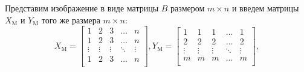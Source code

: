 \documentclass[12pt,a4paper]{article}
\begin{document}
Представим изображение в виде матрицы $B$ размером $m \times n$ и введем матрицы $X_{\text{M}}$ и $Y_{\text{M}}$ того же размера $m \times n$:
\begin{equation}\label{eq:eq16}
X_{\text{M}}=
\begin{bmatrix}
1 & 2 & 3 & \dots  & n \\
1 & 2 & 3 & \dots  & n \\
\vdots & \vdots & \vdots & \ddots & \vdots \\
1 & 2 & 3 & \dots  & n \\
\end{bmatrix}, 
Y_{\text{M}}=
\begin{bmatrix}
1 & 1 & 1 & \dots  & 1 \\
2 & 2 & 2 & \dots  & 2 \\
\vdots & \vdots & \vdots & \ddots & \vdots \\
m & m & m & \dots  & m \\
\end{bmatrix},
\end{equation}
\end{document}
